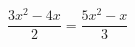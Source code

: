 \begin{ex}
	\begin{condition}
		\( \dfrac{3x^2-4x}{2}=\dfrac{5x^2-x}{3} \)
	\end{condition}
\end{ex}